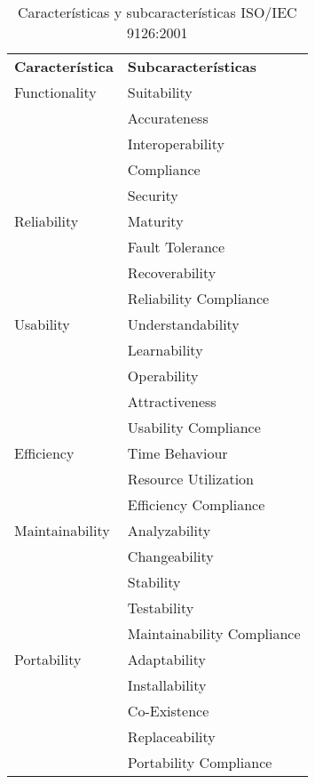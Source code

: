 
\begin{table}
\centering
\renewcommand{\arraystretch}{1}
\caption{Características y subcaracterísticas ISO/IEC 9126:2001}
\label{tab:esquema-clasificacion}
\begin{tabularx}{0.6\textwidth}{p{3cm} X} 
\toprule[1.5pt]
	\bf 	Característica		& 	\bf 	Subcaracterísticas  	\\
	Functionality			& 	Suitability	\\			 											
						&	Accurateness  		\\
						&	Interoperability 	\\
						&	Compliance 		\\
						&	Security 			\\ \hline
	Reliability				&	Maturity \\
						& 	Fault Tolerance \\
						&	Recoverability \\
						&	Reliability Compliance \\ \hline
	Usability				&	Understandability \\
						&	Learnability \\
						&	Operability \\
						&	Attractiveness \\
						&	Usability Compliance \\ \hline
	Efficiency				&	Time Behaviour \\
						&	Resource Utilization \\
						&	Efficiency Compliance \\ \hline
	Maintainability 			&	Analyzability \\
						&	Changeability \\
						&	Stability \\
						&	Testability \\
						&	Maintainability Compliance \\ \hline
	Portability 			&	Adaptability \\
						&	Installability \\
						&	Co-Existence \\
						&	Replaceability \\
						&	Portability Compliance \\
						
			
\bottomrule[0.5pt]
\end{tabularx}
\end{table}

